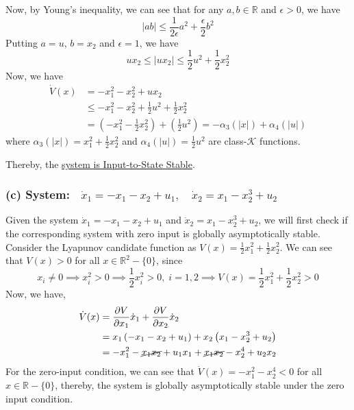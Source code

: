 Now, by Young's inequality, we can see that for any \( a, b \in \mathbb{R} \) and \( \epsilon > 0 \), we have
\begin{equation*}
    \left| a b \right|
    \leq
    \frac{1}{2 \epsilon} a^2 + \frac{\epsilon}{2} b^2
\end{equation*}
Putting \( a = u \), \( b = x_2 \) and \( \epsilon = 1 \), we have
\begin{equation*}
    u x_2 \leq \left| u x_2 \right|
    \leq
    \frac{1}{2} u^2 + \frac{1}{2} x_2^2
\end{equation*}
Now, we have
\begin{align*}
    \dot{V}(x)
     & =
    -x_1^2 - x_2^2 + u x_2
    \\ & \leq
    -x_1^2 - x_2^2 + \frac{1}{2} u^2 + \frac{1}{2} x_2^2
    \\ & =
    \left( -x_1^2 - \frac{1}{2} x_2^2 \right) + \left( \frac{1}{2} u^2 \right)
    =
    - \alpha_3(|x|) + \alpha_4(|u|)
\end{align*}
where \( \alpha_3(|x|) = x_1^2 + \frac{1}{2} x_2^2 \) and \( \alpha_4(|u|) = \frac{1}{2} u^2 \) are class-\( \mathcal{K} \) functions.

Thereby, the \underline{system is Input-to-State Stable}.

\clearpage
\subsubsection*{(c) System:\( \quad \dot{x}_{1}=-x_{1}-x_{2}+u_{1}, \quad \dot{x}_{2}=x_{1}-x_{2}^{3}+u_{2} \)}

Given the system \( \dot{x}_{1}=-x_{1}-x_{2}+u_{1} \) and \( \dot{x}_{2}=x_{1}-x_{2}^{3}+u_{2} \), we will first check if the corresponding system with zero input is globally asymptotically stable.
Consider the Lyapunov candidate function as \( V(x)=\frac{1}{2} x_{1}^{2}+\frac{1}{2} x_{2}^{2} \).
We can see that \( V(x) > 0 \) for all \( x \in \mathbb{R}^2 - \{ 0 \} \), since
\begin{equation*}
    x_i \neq 0
    \implies
    x_i^2 > 0
    \implies
    \frac{1}{2} x_i^2 > 0,
    \;
    i = 1, 2
    \implies
    V(x)
    =
    \frac{1}{2} x_1^2 + \frac{1}{2} x_2^2
    > 0
\end{equation*}
Now, we have,
\begin{align*}
    \dot{V}(x)
     & =
    \frac{\partial V}{\partial x_1} \dot{x}_1 + \frac{\partial V}{\partial x_2} \dot{x}_2
    \\
     & =
    x_1 \left( -x_1 - x_2 + u_1 \right) + x_2 \left( x_1 - x_2^3 + u_2 \right)
    \\
     & =
    -x_1^2 - \cancel{x_1 x_2} + u_1 x_1 + \cancel{x_1 x_2} - x_2^4 + u_2 x_2
\end{align*}
For the zero-input condition, we can see that \( \dot{V}(x) = -x_1^2 - x_2^4 < 0 \) for all \( x \in \mathbb{R} - \{ 0 \} \), thereby, the system is globally asymptotically stable under the zero input condition.

